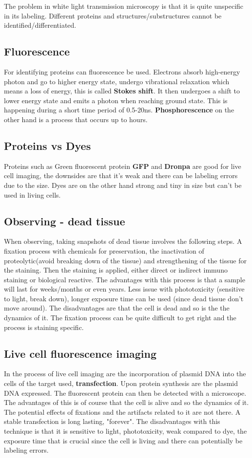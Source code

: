 	The problem in white light transmission microscopy is that it is quite unspecific in its labeling. Different proteins and structures/substructures cannot be identified/differentiated. 

	\subsection{Fluorescence}
	For identifying proteins can fluorescence be used. Electrons absorb high-energy photon and go to higher energy state, undergo vibrational relaxation which means a loss of energy, this is called \textbf{Stokes shift}. It then undergoes a shift to lower energy state and emits a photon when reaching ground state. This is happening during a short time period of 0.5-20ns. \textbf{Phosphorescence} on the other hand is a process that occurs up to hours. 

	\subsection{Proteins vs Dyes}
	Proteins such as Green fluorescent protein \textbf{GFP} and \textbf{Dronpa} are good for live cell imaging, the downsides are that it's weak and there can be labeling errors due to the size. Dyes are on the other hand strong and tiny in size but can't be used in living cells. 

	\subsection{Observing - dead tissue}
	When observing, taking snapshots of dead tissue involves the following steps. A fixation process with chemicals for preservation, the inactivation of proteolytic(avoid breaking down of the tissue) and strengthening of the tissue for the staining. Then the staining is applied, either direct or indirect immuno staining or biological reactive. The advantages with this process is that a sample will last for weeks/months or even years. Less issue with phototoxicity (sensitive to light, break down), longer exposure time can be used (since dead tissue don't move around). The disadvantages are that the cell is dead and so is the the dynamics of it. The fixation process can be quite difficult to get right and the process is staining specific. 


	\subsection{Live cell fluorescence imaging}
	In the process of live cell imaging are the incorporation of plasmid DNA into the cells of the target used, \textbf{transfection}. Upon protein synthesis are the plasmid DNA expressed. The fluorescent protein can then be detected with a microscope. The advantages of this is of course that the cell is alive and so the dynamics of it. The potential effects of fixations and the artifacts related to it are not there. A stable transfection is long lasting, "forever". The disadvantages with this technique is that it is sensitive to light, phototoxicity, weak compared to dye, the exposure time that is crucial since the cell is living and there can potentially be labeling errors. 

